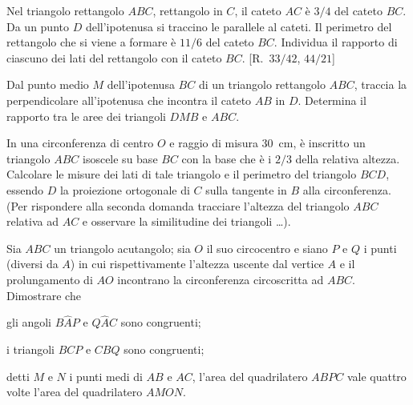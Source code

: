 \begin{multicols}{2}
\begin{esercizio}
\label{ese:6.93}
Nel triangolo rettangolo $ABC$, rettangolo in $C$, il cateto $AC$ è $3/4$ del cateto $BC$. Da un punto $D$ dell'ipotenusa si traccino le parallele al cateti. Il perimetro del rettangolo che si viene a formare è $11/6$ del cateto $BC$. Individua il rapporto di ciascuno dei lati del rettangolo con il cateto $BC$. [R.~$33/42$, $44/21$]
\end{esercizio}

\begin{esercizio}
\label{ese:6.94}
Dal punto medio $M$ dell'ipotenusa $BC$ di un triangolo rettangolo $ABC$, traccia la perpendicolare all'ipotenusa che incontra il cateto $AB$ in $D$. Determina il rapporto tra le aree dei triangoli $DMB$ e $ABC$.
\end{esercizio}

\begin{esercizio}
\label{ese:6.95}
In una circonferenza di centro $O$ e raggio di misura 30~cm, è inscritto un triangolo $ABC$ isoscele su base $BC$ con la base che è i $2/3$ della relativa altezza. Calcolare le misure dei lati di tale triangolo e il perimetro del triangolo $BCD$, essendo $D$ la proiezione ortogonale di $C$ sulla tangente in $B$ alla circonferenza. (Per rispondere alla seconda domanda tracciare l'altezza del triangolo $ABC$ relativa ad $AC$ e osservare la similitudine dei triangoli \ldots{}).
\end{esercizio}

\end{multicols}

\begin{esercizio}
\label{ese:6.96}
Sia $ABC$ un triangolo acutangolo; sia $O$ il suo circocentro e siano $P$ e $Q$ i punti (diversi da $A$) in cui rispettivamente l'altezza uscente dal vertice $A$ e il prolungamento di $AO$ incontrano la circonferenza circoscritta ad $ABC$. Dimostrare che
\begin{enumeratea}
\item gli angoli $B\widehat{A}P$ e $Q\widehat{A}C$ sono congruenti;
\item i triangoli $BCP$ e $CBQ$ sono congruenti;
\item detti $M$ e $N$ i punti medi di $AB$ e $AC$, l'area del quadrilatero $ABPC$ vale quattro volte l'area del quadrilatero $AMON$.
\end{enumeratea}
\end{esercizio}

